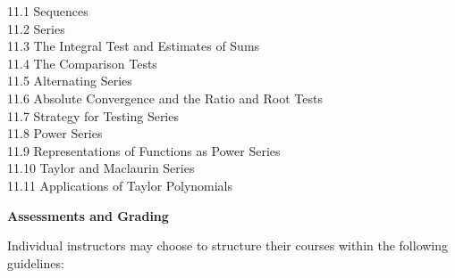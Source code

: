 \documentclass[12 pt]{article}
\begin{document}
\begin{itemize}
		          11.1 Sequences\\
		          11.2 Series \\
		          11.3 The Integral Test and Estimates of Sums\\
		          11.4 The Comparison Tests\\
		          11.5 Alternating Series\\
		          11.6 Absolute Convergence and the Ratio and Root Tests\\
		          11.7 Strategy for Testing Series\\
		          11.8 Power Series\\
		          11.9 Representations of Functions as Power Series\\
		          11.10 Taylor and Maclaurin Series\\
		          11.11 Applications of Taylor Polynomials\\

		\end{itemize}


\bigskip


\noindent
{\bf Assessments and Grading}

Individual instructors may choose to structure their courses within the following guidelines:
\end{document}
